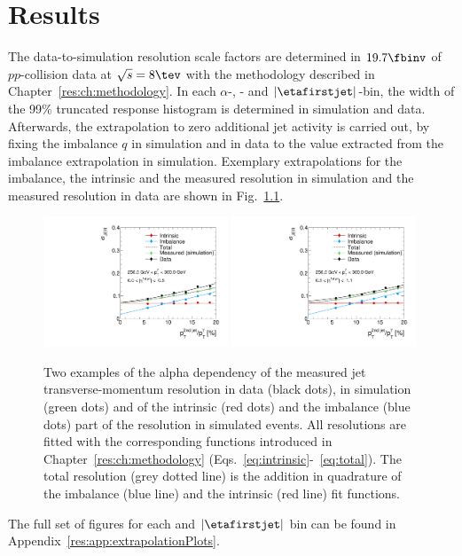 \chapter{Results}
\label{res:ch:results}

The data-to-simulation resolution scale factors \rhores are determined in $19.7\fbinv$ of $pp$-collision data at $\sqrt{s} = 8 \tev$ with the methodology described in Chapter~\ref{res:ch:methodology}.
In each $\alpha$-, \ptgamma- and $|\etafirstjet|$-bin, the width of the 99\% truncated response histogram is determined in simulation and data.
Afterwards, the extrapolation to zero additional jet activity is carried out, by fixing the imbalance $q$ in simulation and in data to the value extracted from the imbalance extrapolation in simulation.
Exemplary extrapolations for the imbalance, the intrinsic and the measured resolution in simulation and the measured resolution in data are shown in Fig.~\ref{res:fig:ExtrapolationsWithData}.
\begin{figure}[!t]
 \centering
    \includegraphics[width=0.49\textwidth]{figures/resolution/results/JER_for_1_eta_bin_10_pTGamma_bin_all_contributions_PFCHS_RMS99_mc.pdf}
    \includegraphics[width=0.49\textwidth]{figures/resolution/results/JER_for_2_eta_bin_10_pTGamma_bin_all_contributions_PFCHS_RMS99_mc.pdf}
  \caption{Two examples of the alpha dependency of the measured jet transverse-momentum resolution in data (black dots), in simulation (green dots) and  of the intrinsic (red dots) and the imbalance (blue dots) part 
           of the resolution in simulated events. All resolutions are fitted with the corresponding functions introduced in Chapter~\ref{res:ch:methodology} (Eqs.~\eqref{eq:intrinsic}-~\eqref{eq:total}).
           The total resolution (grey dotted line) is the addition in quadrature of the imbalance (blue line) and the intrinsic (red line) fit functions. }
  \label{res:fig:ExtrapolationsWithData}
\end{figure}
The full set of figures for each \ptgamma and $|\etafirstjet|$ bin can be found in Appendix~\ref{res:app:extrapolationPlots}.

